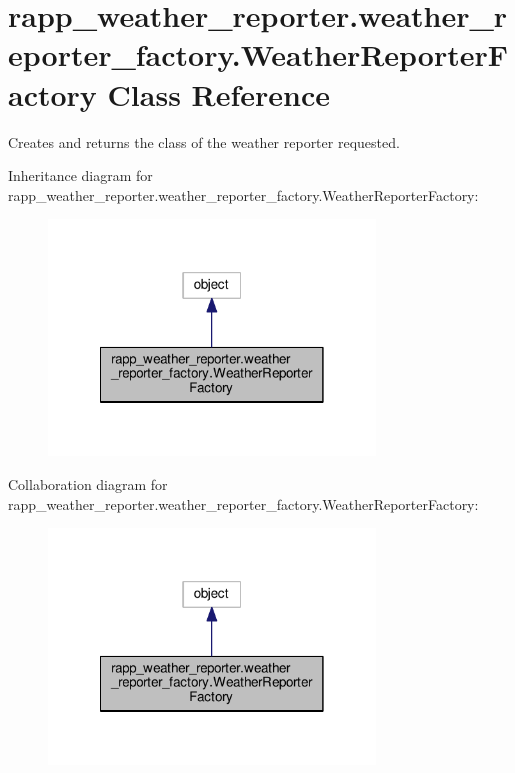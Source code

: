 \hypertarget{classrapp__weather__reporter_1_1weather__reporter__factory_1_1WeatherReporterFactory}{\section{rapp\-\_\-weather\-\_\-reporter.\-weather\-\_\-reporter\-\_\-factory.\-Weather\-Reporter\-Factory Class Reference}
\label{classrapp__weather__reporter_1_1weather__reporter__factory_1_1WeatherReporterFactory}
}


Creates and returns the class of the weather reporter requested.  




Inheritance diagram for rapp\-\_\-weather\-\_\-reporter.\-weather\-\_\-reporter\-\_\-factory.\-Weather\-Reporter\-Factory\-:
\nopagebreak
\begin{figure}[H]
\begin{center}
\leavevmode
\includegraphics[width=246pt]{classrapp__weather__reporter_1_1weather__reporter__factory_1_1WeatherReporterFactory__inherit__graph}
\end{center}
\end{figure}


Collaboration diagram for rapp\-\_\-weather\-\_\-reporter.\-weather\-\_\-reporter\-\_\-factory.\-Weather\-Reporter\-Factory\-:
\nopagebreak
\begin{figure}[H]
\begin{center}
\leavevmode
\includegraphics[width=246pt]{classrapp__weather__reporter_1_1weather__reporter__factory_1_1WeatherReporterFactory__coll__graph}
\end{center}
\end{figure}
